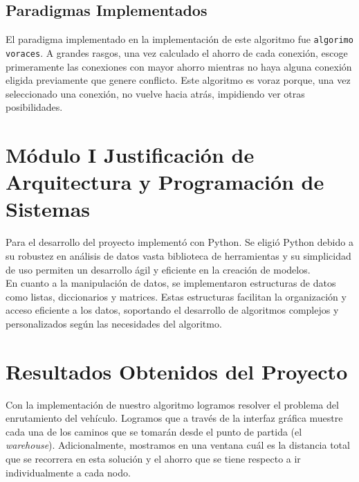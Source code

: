 \documentclass[10pt,twocolumn,letterpaper]{article}
\begin{document}
\subsection{Paradigmas Implementados}

El paradigma implementado en la implementación de este algoritmo fue \texttt{algorimo voraces}. A grandes rasgos, una vez calculado el ahorro de cada conexión, escoge primeramente las conexiones con mayor ahorro mientras no haya alguna conexión eligida previamente que genere conflicto. Este algoritmo es voraz porque, una vez seleccionado una conexión, no vuelve hacia atrás, impidiendo ver otras posibilidades.

\section*{Módulo I Justificación de Arquitectura y Programación de Sistemas}
Para el desarrollo del proyecto implementó con Python. Se eligió Python debido a su robustez en análisis de datos vasta biblioteca de herramientas y su simplicidad de uso permiten un desarrollo ágil y eficiente en la creación de modelos.\\

En cuanto a la manipulación de datos, se implementaron estructuras de datos como listas, diccionarios y matrices. Estas estructuras facilitan la organización y acceso eficiente a los datos, soportando el desarrollo de algoritmos complejos y personalizados según las necesidades del algoritmo.

\section{Resultados Obtenidos del Proyecto}
Con la implementación de nuestro algoritmo logramos resolver el problema del enrutamiento del vehículo. Logramos que a través de la interfaz gráfica muestre cada una de los caminos que se tomarán desde el punto de partida (el \textit{warehouse}). Adicionalmente, mostramos en una ventana cuál es la distancia total que se recorrera en esta solución y el ahorro que se tiene respecto a ir individualmente a cada nodo.
\end{document}

